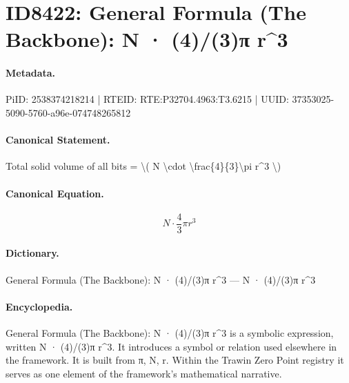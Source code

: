 \section*{ID8422: General Formula (The Backbone): N · (4)/(3)π r\textasciicircum{}3}
\paragraph{Metadata.}
PiID: 2538374218214 | RTEID: RTE:P32704.4963:T3.6215 | UUID: 37353025-5090-5760-a96e-074748265812

\paragraph{Canonical Statement.}
Total solid volume of all bits = \textbackslash{}( N \textbackslash{}cdot \textbackslash{}frac\{4\}\{3\}\textbackslash{}pi r\textasciicircum{}3 \textbackslash{})

\paragraph{Canonical Equation.}
\[
N \cdot \frac{4}{3}\pi r^3
\]

\paragraph{Dictionary.}
General Formula (The Backbone): N · (4)/(3)π r\textasciicircum{}3 — N · (4)/(3)π r\textasciicircum{}3

\paragraph{Encyclopedia.}
General Formula (The Backbone): N · (4)/(3)π r\textasciicircum{}3 is a symbolic expression, written N · (4)/(3)π r\textasciicircum{}3. It introduces a symbol or relation used elsewhere in the framework. It is built from π, N, r. Within the Trawin Zero Point registry it serves as one element of the framework's mathematical narrative.
